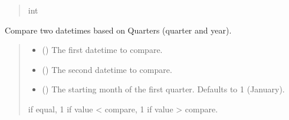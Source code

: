 \documentclass[letterpaper,10pt,english]{sphinxmanual}
\begin{document}
\begin{fulllineitems}
\begin{fulllineitems}
\begin{quote}
\begin{description}
\sphinxAtStartPar
int

\end{description}\end{quote}

\end{fulllineitems}


\begin{fulllineitems}
\label{\detokenize{apache_commons_validator_python.routines:apache_commons_validator_python.routines.calendar_validator.CalendarValidator.compare_quarters}}
\pysigstartsignatures
{}
\pysigstopsignatures
\sphinxAtStartPar
Compare two datetimes based on Quarters (quarter and year).
\begin{quote}\begin{description}
\begin{itemize}
\item {} 
\sphinxAtStartPar
{} () \textendash{} The first datetime to compare.

\item {} 
\sphinxAtStartPar
{} () \textendash{} The second datetime to compare.

\item {} 
\sphinxAtStartPar
{} () \textendash{} The starting month of the first quarter. Defaults to 1 (January).

\end{itemize}

 if equal, \sphinxhyphen{}1 if value \textless{} compare, 1 if value \textgreater{} compare.


\end{description}
\end{quote}
\end{fulllineitems}
\end{fulllineitems}
\end{document}
